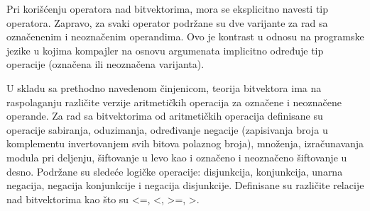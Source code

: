 \documentclass[12pt,oneside]{memoir}
\begin{document}
Pri korišćenju operatora nad bitvektorima, mora se eksplicitno navesti tip operatora. Zapravo, za svaki operator podržane su dve varijante za rad sa označenenim i neoznačenim operandima. Ovo je kontrast u odnosu na programske jezike u kojima kompajler na osnovu argumenata implicitno određuje tip operacije (označena ili neoznačena varijanta).
\par
U skladu sa prethodno navedenom činjenicom, teorija bitvektora ima na raspolaganju različite verzije aritmetičkih operacija za označene i neoznačene operande. Za rad sa bitvektorima od aritmetičkih operacija definisane su operacije sabiranja, oduzimanja, određivanje negacije (zapisivanja broja u komplementu invertovanjem svih bitova polaznog broja), množenja, izračunavanja modula pri deljenju, šiftovanje u levo kao i označeno i neoznačeno šiftovanje u desno. Podržane su sledeće logičke operacije: disjunkcija, konjunkcija, unarna negacija, negacija konjunkcije i negacija disjunkcije. Definisane su različite relacije nad bitvektorima kao što su <=, <, >=, >.
\end{document}
